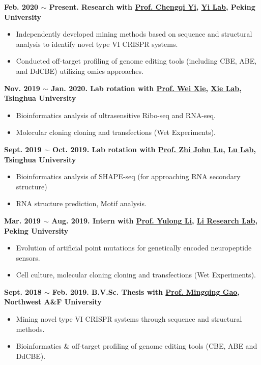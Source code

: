 \textbf{
    Feb. 2020 $\sim$ Present. Research with \href{https://www.bio.pku.edu.cn/enhomes/news/teacher_dis/91.html}{Prof. Chengqi Yi}, \href{https://yilab.org.cn/}{Yi Lab}, Peking University
}
\begin{itemize}
    \item Independently developed mining methods based on sequence and structural analysis to identify novel type VI CRISPR systems.
    \item Conducted off-target profiling of genome editing tools (including CBE, ABE, and DdCBE) utilizing omics approaches.
\end{itemize}

\textbf{
    Nov. 2019 $\sim$ Jan. 2020. Lab rotation with \href{https://life.tsinghua.edu.cn/lifeen/info/1034/1077.htm}{Prof. Wei Xie}, \href{http://www.xielab.org.cn/}{Xie Lab}, Tsinghua University
}
\begin{itemize}
    \item Bioinformatics analysis of ultrasensitive Ribo-seq and RNA-seq.
    \item Molecular cloning cloning and transfections (Wet Experiments).
\end{itemize}

\textbf{
    Sept. 2019 $\sim$ Oct. 2019. Lab rotation with \href{https://life.tsinghua.edu.cn/lifeen/info/1034/1083.htm}{Prof. Zhi John Lu}, \href{https://lulab.life.tsinghua.edu.cn/labhome/home/}{Lu Lab}, Tsinghua University
}
\begin{itemize}
    \item Bioinformatics analysis of SHAPE-seq (for approaching RNA secondary structure)
    \item RNA structure prediction, Motif analysis.
\end{itemize}

\textbf{
    Mar. 2019 $\sim$ Aug. 2019. Intern with \href{https://www.bio.pku.edu.cn/enhomes/news/teacher_dis/43.html}{Prof. Yulong Li}, \href{http://www.yulonglilab.org/}{Li Research Lab}, Peking University
}
\begin{itemize}
    \item Evolution of artificial point mutations for genetically encoded neuropeptide sensors.
    \item Cell culture, molecular cloning cloning and transfections (Wet Experiments).
\end{itemize}

\textbf{
    Sept. 2018 $\sim$ Feb. 2019. B.V.Sc. Thesis with \href{https://faculty.nwu.edu.cn/gaomingqing/en/index.htm}{Prof. Mingqing Gao}, Northwest A\&F University
}
\begin{itemize}
    \item Mining novel type VI CRISPR systems through sequence and structural methods.
    \item Bioinformatics \& off-target profiling of genome editing tools (CBE, ABE and DdCBE).
\end{itemize}

